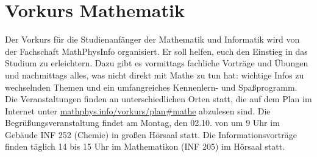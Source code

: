 \section{Vorkurs Mathematik}
Der Vorkurs für die Studienanfänger der Mathematik und Informatik wird von der Fachschaft MathPhysInfo organisiert. Er soll helfen, euch den Einstieg in das Studium zu erleichtern. Dazu gibt es vormittags fachliche Vorträge und Übungen und nachmittags alles, was nicht direkt mit Mathe zu tun hat: wichtige Infos zu wechselnden Themen und ein umfangreiches Kennenlern- und Spaßprogramm.
Die Veranstaltungen finden an unterschiedlichen Orten statt, die auf dem Plan im Internet  unter \url{mathphys.info/vorkurs/plan\#mathe} abzulesen sind. Die Begrüßungsveranstaltung findet am Montag, den 02.10. von um 9 Uhr im Gebäude \gls{INF} 252 (Chemie) in großen Hörsaal statt. Die Informationsvorträge finden täglich 14 bis 15 Uhr im Mathematikon (\gls{INF} 205) im Hörsaal statt.

